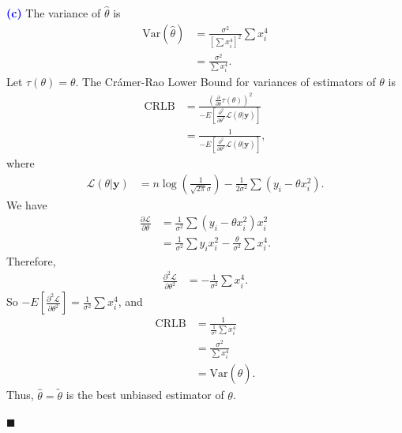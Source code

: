 \documentclass[12pt]{article}
\begin{document}
\noindent \textcolor{blue}{\textbf{(c)}} The variance of $\hat{\theta}$ is
\begin{align}
\text{Var}\left(\hat{\theta}\right) &= \frac{\sigma^2}{\left[\sum x_i^4\right]^2}\sum x_i^4 \\
&= \frac{\sigma^2}{\sum x_i^4}. 
\end{align}
Let $\tau(\theta) = \theta$. The Cr\'{a}mer-Rao Lower Bound for variances of estimators of $\theta$ is 
\begin{align}
\text{CRLB} &= \frac{\left(\frac{\partial}{\partial\theta}\tau(\theta)\right)^2}{-E\left[\frac{\partial^2}{\partial\theta^2}\mathscr{L}(\theta|\textbf{y})\right]} \\
&= \frac{1}{-E\left[\frac{\partial^2}{\partial\theta^2}\mathscr{L}(\theta|\textbf{y})\right]},
\end{align}
where
\begin{align}
\mathscr{L}(\theta|\textbf{y}) &= n\log\left(\frac{1}{\sqrt{2\pi}\sigma}\right) - \frac{1}{2\sigma^2}\sum(y_i - \theta x_i^2).
\end{align}
We have 
\begin{align}
\frac{\partial \mathscr{L}}{\partial \theta} &= \frac{1}{\sigma^2}\sum (y_i - \theta x_i^2)x_i^2 \\
&= \frac{1}{\sigma^2}\sum y_i x_i^2 - \frac{\theta}{\sigma^2}\sum x_i^4.
\end{align}
Therefore,
\begin{align}
\frac{\partial^2 \mathscr{L}}{\partial \theta^2} &= -\frac{1}{\sigma^2}\sum x_i^4.
\end{align}
So $-E\left[\frac{\partial^2 \mathscr{L}}{\partial \theta^2}\right] = \frac{1}{\sigma^2}\sum x_i^4$, and 
\begin{align}
\text{CRLB} &= \frac{1}{\frac{1}{\sigma^2}\sum x_i^4} \\
&= \frac{\sigma^2}{\sum x_i^4} \\
&= \text{Var}\left(\hat{\theta}\right).
\end{align}
Thus, $\hat{\theta} = \tilde{\theta}$ is the best unbiased estimator of $\theta$. 

\hfill$\blacksquare$

\vfill
\begin{center}
\end{center}
\begin{center}
\vspace{-0.6cm}
\hrulefill \\
\vspace{-0.7cm}
\hrulefill
\end{center}
\end{document}
